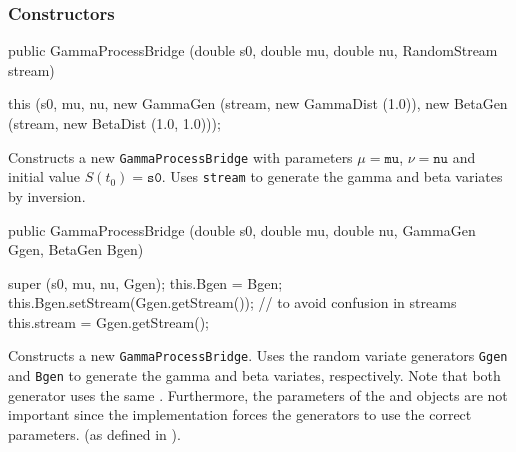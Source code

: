 \subsubsection* {Constructors}
\begin{code}

   public GammaProcessBridge (double s0, double mu, double nu,
                              RandomStream stream) \begin{hide} {
        this (s0, mu, nu, new GammaGen (stream, new GammaDist (1.0)),
                          new BetaGen (stream, new BetaDist (1.0, 1.0)));
    }\end{hide}
\end{code}
\begin{tabb} Constructs a new \texttt{GammaProcessBridge} with parameters
$\mu = \texttt{mu}$, $\nu = \texttt{nu}$ and initial value $S(t_{0}) = \texttt{s0}$.
Uses \texttt{stream} to generate the gamma and beta variates by inversion.
\end{tabb}
\begin{code}

   public GammaProcessBridge (double s0, double mu, double nu,
                              GammaGen Ggen, BetaGen Bgen) \begin{hide} {
        super (s0, mu, nu, Ggen);
        this.Bgen = Bgen;
        this.Bgen.setStream(Ggen.getStream()); // to avoid confusion in streams
        this.stream = Ggen.getStream();
    }\end{hide}
\end{code}
\begin{tabb} Constructs a new \texttt{GammaProcessBridge}. Uses the
random variate generators \texttt{Ggen} and \texttt{Bgen} to generate the gamma
and beta variates, respectively. Note that both generator uses the
same . Furthermore, the
parameters of the
 and
 objects are not
important since the implementation forces the generators to use
the correct parameters.
(as defined in \cite[page 7]{fRIB02a}).
\end{tabb}
